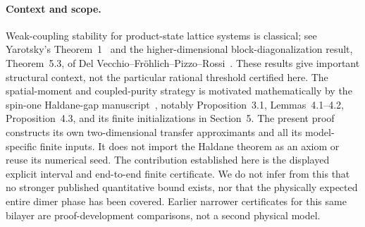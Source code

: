 \paragraph{Context and scope.}
Weak-coupling stability for product-state lattice systems is classical; see
Yarotsky's Theorem~1~\cite{yarotsky} and the higher-dimensional block-diagonalization
result, Theorem~5.3, of Del Vecchio--Fr\"ohlich--Pizzo--Rossi~\cite{delvecchio}.
These results give important structural context, not the particular rational
threshold certified here. The spatial-moment and coupled-purity strategy is
motivated mathematically by the spin-one Haldane-gap manuscript~\cite{haldane},
notably Proposition~3.1, Lemmas~4.1--4.2, Proposition~4.3, and its finite
initializations in Section~5. The present proof constructs its own two-dimensional
transfer approximants and all its model-specific finite inputs. It does not
import the Haldane theorem as an axiom or reuse its numerical seed.
The contribution established here is the displayed explicit interval and
end-to-end finite certificate. We do not infer from this that no stronger
published quantitative bound exists, nor that the physically expected entire
dimer phase has been covered. Earlier narrower certificates for this same
bilayer are proof-development comparisons, not a second physical model.
